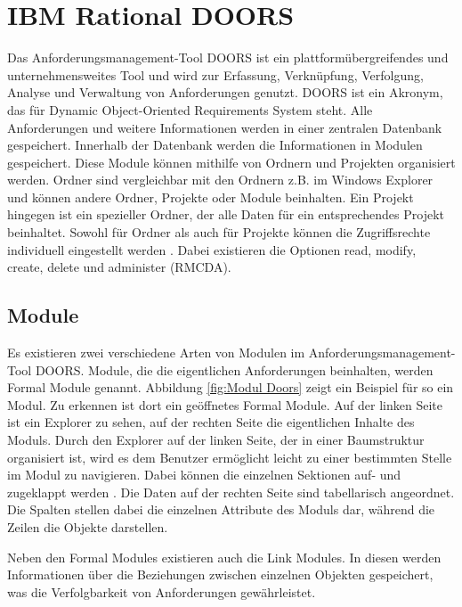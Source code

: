 \section{IBM Rational DOORS}
\label{chap:DOORS}

Das Anforderungsmanagement-Tool \ac{DOORS} ist ein plattformübergreifendes und unternehmensweites Tool und wird
zur Erfassung, Verknüpfung, Verfolgung, Analyse und Verwaltung von Anforderungen genutzt. \ac{DOORS} ist ein Akronym,
das für Dynamic Object-Oriented Requirements System steht. Alle Anforderungen und weitere Informationen werden in einer zentralen Datenbank
gespeichert. Innerhalb der Datenbank werden die Informationen in Modulen gespeichert. Diese Module können mithilfe von Ordnern und Projekten
organisiert werden. Ordner sind vergleichbar mit den Ordnern z.B. im Windows Explorer und können andere Ordner, Projekte oder Module
beinhalten. Ein Projekt hingegen ist ein spezieller Ordner, der alle Daten für ein entsprechendes Projekt beinhaltet. Sowohl für 
Ordner als auch für Projekte können die Zugriffsrechte individuell eingestellt werden \cite[vgl. S.173]{DOORS}. Dabei existieren die Optionen
read, modify, create, delete und administer (RMCDA). 

\subsection{Module}
Es existieren zwei verschiedene Arten von Modulen im Anforderungsmanagement-Tool \ac{DOORS}. Module, die die eigentlichen Anforderungen
beinhalten, werden Formal Module genannt. Abbildung \ref*{fig:Modul Doors} zeigt ein Beispiel für so ein Modul. Zu erkennen ist dort
ein geöffnetes Formal Module. Auf der linken Seite ist ein Explorer zu sehen, auf der rechten Seite die eigentlichen Inhalte des Moduls.
Durch den Explorer auf der linken Seite, der in einer Baumstruktur organisiert ist, wird es dem Benutzer ermöglicht leicht zu einer bestimmten
Stelle im Modul zu navigieren. Dabei können die einzelnen Sektionen auf- und zugeklappt werden \cite[vgl. S.176]{DOORS}. Die Daten auf der 
rechten Seite sind tabellarisch angeordnet. Die Spalten stellen dabei die einzelnen Attribute des Moduls dar, während die Zeilen die 
Objekte darstellen. 

Neben den Formal Modules existieren auch die Link Modules. In diesen werden Informationen über die Beziehungen zwischen einzelnen Objekten
gespeichert, was die Verfolgbarkeit von Anforderungen gewährleistet.

